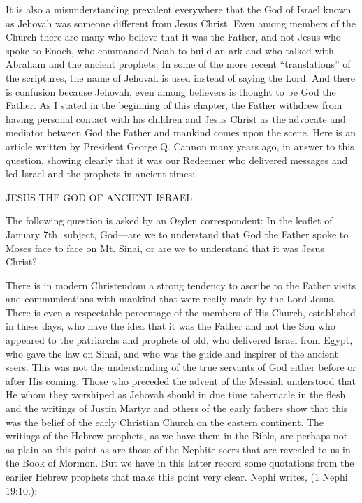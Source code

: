 It is also a misunderstanding prevalent everywhere that the God of Israel known as Jehovah
was someone different from Jesus Christ. Even among members of the Church there are
many who believe that it was the Father, and not Jesus who spoke to Enoch, who
commanded Noah to build an ark and who talked with Abraham and the ancient prophets. In
some of the more recent ``translations'' of the scriptures, the name of Jehovah is used instead
of saying the Lord. And there is confusion because Jehovah, even among believers is thought
to be God the Father. As I stated in the beginning of this chapter, the Father withdrew from
having personal contact with his children and Jesus Christ as the advocate and mediator
between God the Father and mankind comes upon the scene. Here is an article written by
President George Q. Cannon many years ago, in answer to this question, showing clearly that
it was our Redeemer who delivered messages and led Israel and the prophets in ancient
times:

JESUS THE GOD OF ANCIENT ISRAEL

The following question is asked by an Ogden correspondent: In the leaflet of January 7th,
subject, God—are we to understand that God the Father spoke to Moses face to face on Mt.
Sinai, or are we to understand that it was Jesus Christ?

There is in modern Christendom a strong tendency to ascribe to the Father visits and
communications with mankind that were really made by the Lord Jesus. There is even a
respectable percentage of the members of His Church, established in these days, who have
the idea that it was the Father and not the Son who appeared to the patriarchs and prophets of
old, who delivered Israel from Egypt, who gave the law on Sinai, and who was the guide and
inspirer of the ancient seers. This was not the understanding of the true servants of God either
before or after His coming. Those who preceded the advent of the Messiah understood that
He whom they worshiped as Jehovah should in due time tabernacle in the flesh, and the
writings of Justin Martyr and others of the early fathers show that this was the belief of the
early Christian Church on the eastern continent. The writings of the Hebrew prophets, as we
have them in the Bible, are perhaps not as plain on this point as are those of the Nephite seers
that are revealed to us in the Book of Mormon. But we have in this latter record some
quotations from the earlier Hebrew prophets that make this point very clear. Nephi writes, (1
Nephi 19:10.):

